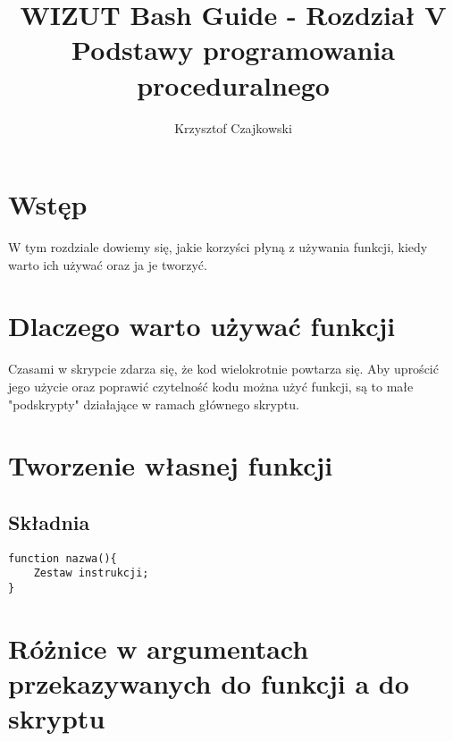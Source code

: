\documentclass[10 pt, a4paper]{article}
\author{Krzysztof Czajkowski}
\title{WIZUT Bash Guide - Rozdział V\\
Podstawy programowania proceduralnego}
\begin{document}
\maketitle
\tableofcontents
\newpage
\section{Wstęp}
W tym rozdziale dowiemy się, jakie korzyści płyną z używania funkcji, kiedy warto ich używać oraz ja je tworzyć.
\section{Dlaczego warto używać funkcji}
Czasami w skrypcie zdarza się, że kod wielokrotnie powtarza się. Aby uprościć jego użycie
oraz poprawić czytelność kodu można użyć funkcji, są to małe "podskrypty" działające w
ramach głównego skryptu.
\section{Tworzenie własnej funkcji}
\subsection{Składnia}
\begin{lstlisting}
function nazwa(){
	Zestaw instrukcji;
}
\end{lstlisting}
\section{Różnice w argumentach przekazywanych do funkcji a do skryptu}
\end{document}
